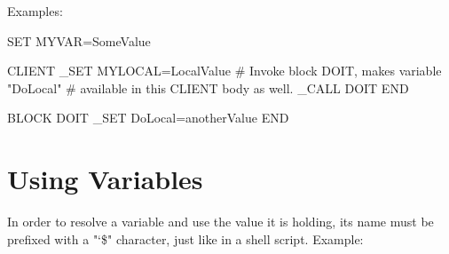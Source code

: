 Examples:

\begin{usplisting}
    SET MYVAR=SomeValue
    
    CLIENT
    _SET MYLOCAL=LocalValue
    # Invoke block DOIT, makes variable "DoLocal"
    # available in this CLIENT body as well.
    _CALL DOIT
    END
    
    BLOCK DOIT
    _SET DoLocal=anotherValue
    END
\end{usplisting}

\newpage
\section{Using Variables}

In order to resolve a variable and use the value it is holding, 
its name must be prefixed with a "\char`\$" character, just like 
in a shell script. Example:


